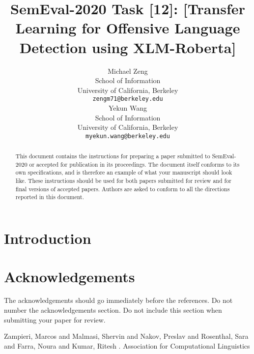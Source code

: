 \documentclass[11pt]{article}
\title{SemEval-2020 Task [12]: [Transfer Learning for Offensive Language Detection using XLM-Roberta]}
\author{Michael Zeng\\
  School of Information\\
  University of California, Berkeley \\
  {\tt zengm71@berkeley.edu} \\\And
  Yekun  Wang\\
  School of Information\\
  University of California, Berkeley \\
  {\tt myekun.wang@berkeley.edu} \\}
\date{}
\begin{document}
\maketitle
\begin{abstract}
  This document contains the instructions for preparing a paper submitted
  to SemEval-2020 or accepted for publication in its proceedings. The document itself
  conforms to its own specifications, and is therefore an example of
  what your manuscript should look like. These instructions should be
  used for both papers submitted for review and for final versions of
  accepted papers. Authors are asked to conform to all the directions
  reported in this document.
\end{abstract}

\section{Introduction}
\label{intro}



\section*{Acknowledgements}

The acknowledgements should go immediately before the references.  Do
not number the acknowledgements section. Do not include this section
when submitting your paper for review.




\begin{thebibliography}{}

Zampieri, Marcos  and
      Malmasi, Shervin  and
      Nakov, Preslav  and
      Rosenthal, Sara  and
      Farra, Noura  and
      Kumar, Ritesh
.
\newblock Association for Computational Linguistics
\end{thebibliography}
\end{document}
